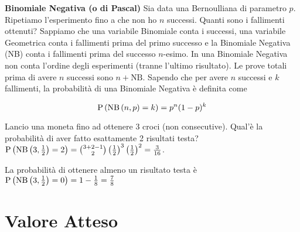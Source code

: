 \begin{defn}
	\textbf{Binomiale Negativa (o di Pascal)}
	Sia data una Bernoulliana di parametro $ p $. Ripetiamo l'esperimento fino a che non ho $ n $ successi. Quanti sono i fallimenti ottenuti? Sappiamo che una variabile Binomiale conta i successi, una variabile Geometrica conta i fallimenti prima del primo successo e la Binomiale Negativa (NB) conta i fallimenti prima del successo $ n $-esimo. In una Binomiale Negativa non conta l'ordine degli esperimenti (tranne l'ultimo risultato). Le prove totali prima di avere $ n $ successi sono $ n+\text{NB} $. Sapendo che per avere $ n $ successi e $ k $ fallimenti, la probabilità di una Binomiale Negativa è definita come 
	
	\begin{equation*}
	\text{P}\left(\text{NB}\left(n, p\right) = k\right) = p^n(1-p)^k
	\end{equation*}
\end{defn}

\begin{exmp}
	Lancio una moneta fino ad ottenere 3 croci (non consecutive). Qual'è la probabilità di aver fatto esattamente 2 risultati testa? $ \text{P}\left(\text{NB}\left(3, \frac{1}{2}\right) = 2\right) = \binom{3+2-1}{2} \left(\frac{1}{2}\right)^3 \left(\frac{1}{2}\right)^2 = \frac{3}{16} $. 
	
	La probabilità di ottenere almeno un risultato testa è $ \text{P}\left(\text{NB}\left(3, \frac{1}{2}\right) = 0\right) = 1 - \frac{1}{8} = \frac{7}{8} $
\end{exmp} 

\section{Valore Atteso}

